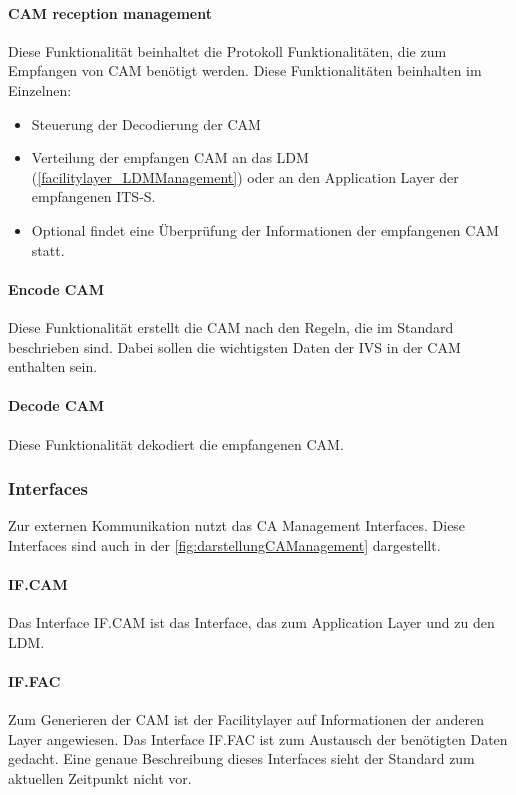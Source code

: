 \paragraph{CAM reception management}
Diese Funktionalität beinhaltet die Protokoll Funktionalitäten, die zum Empfangen von \ac{CAM} benötigt werden. Diese Funktionalitäten beinhalten im Einzelnen:
\begin{itemize}
	\item Steuerung der Decodierung der \ac{CAM}
	\item Verteilung der empfangen \ac{CAM} an das \ac{LDM} (\ref{facilitylayer_LDMManagement}) oder an den Application Layer der empfangenen \ac{ITS-S}.
	\item Optional findet eine Überprüfung der Informationen der empfangenen \ac{CAM} statt.
\end{itemize}

\paragraph{Encode CAM}
Diese Funktionalität erstellt die \ac{CAM} nach den Regeln, die im Standard \cite{en302637-2} beschrieben sind. Dabei sollen die wichtigsten Daten der \ac{IVS} in der \ac{CAM} enthalten sein.

\paragraph{Decode CAM}
Diese Funktionalität dekodiert die empfangenen \ac{CAM}.


\subsubsection{Interfaces \label{facilitylayer_cam_interfaces}}
Zur externen Kommunikation nutzt das \ac{CA} Management Interfaces. Diese Interfaces sind auch in der  \autoref{fig:darstellungCAManagement} dargestellt. 

\paragraph{IF.CAM}
Das Interface IF.CAM ist das Interface, das zum Application Layer und zu den \ac{LDM}. 

\paragraph{IF.FAC}
Zum Generieren der \ac{CAM} ist der Facilitylayer auf Informationen der anderen Layer angewiesen. Das Interface IF.FAC ist zum Austausch der benötigten Daten gedacht. Eine genaue Beschreibung dieses Interfaces sieht der Standard \cite{en302637-2} zum aktuellen Zeitpunkt nicht vor. 

